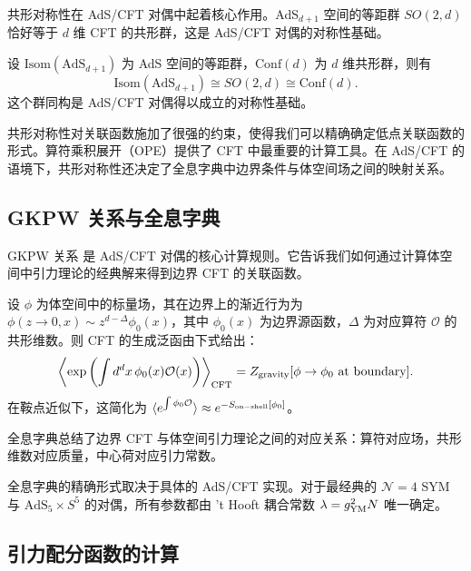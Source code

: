 共形对称性在 AdS/CFT 对偶中起着核心作用。AdS$_{d+1}$ 空间的等距群 $SO(2,d)$ 恰好等于 $d$ 维 CFT 的共形群，这是 AdS/CFT 对偶的对称性基础。

\begin{property}[对称性匹配]
设 $\text{Isom}(\text{AdS}_{d+1})$ 为 AdS 空间的等距群，$\text{Conf}(d)$ 为 $d$ 维共形群，则有
\begin{equation}
    \text{Isom}(\text{AdS}_{d+1}) \cong SO(2,d) \cong \text{Conf}(d).
\end{equation}
这个群同构是 AdS/CFT 对偶得以成立的对称性基础。
\end{property}

共形对称性对关联函数施加了很强的约束，使得我们可以精确确定低点关联函数的形式。算符乘积展开（OPE）提供了 CFT 中最重要的计算工具。在 AdS/CFT 的语境下，共形对称性还决定了全息字典中边界条件与体空间场之间的映射关系。

\subsection{GKPW 关系与全息字典}

GKPW 关系 \cite{Gubser1998, Witten1998} 是 AdS/CFT 对偶的核心计算规则。它告诉我们如何通过计算体空间中引力理论的经典解来得到边界 CFT 的关联函数。

\begin{theorem}[GKPW 关系]
设 $\phi$ 为体空间中的标量场，其在边界上的渐近行为为 $\phi(z \to 0, x) \sim z^{d-\Delta} \phi_0(x)$，其中 $\phi_0(x)$ 为边界源函数，$\Delta$ 为对应算符 $\mathcal{O}$ 的共形维数。则 CFT 的生成泛函由下式给出：
\begin{equation}
    \left\langle \exp\left( \int d^d x \, \phi_0(x) \mathcal{O}(x) \right) \right\rangle_{\rm CFT}
    = Z_{\rm gravity}[\phi \to \phi_0 \text{ at boundary}].
\end{equation}
在鞍点近似下，这简化为 $\langle e^{\int \phi_0 \mathcal{O}} \rangle \approx e^{-S_{\rm on-shell}[\phi_0]}$。
\end{theorem}

全息字典总结了边界 CFT 与体空间引力理论之间的对应关系：算符对应场，共形维数对应质量，中心荷对应引力常数。

\begin{note}
全息字典的精确形式取决于具体的 AdS/CFT 实现。对于最经典的 $\mathcal{N}=4$ SYM 与 $\text{AdS}_5 \times S^5$ 的对偶，所有参数都由 't Hooft 耦合常数 $\lambda = g_{\rm YM}^2 N$ 唯一确定。
\end{note}

\subsection{引力配分函数的计算}

